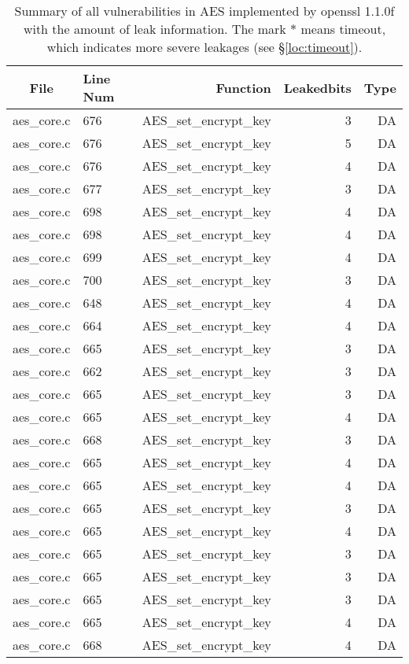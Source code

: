 \begin{table}%
\centering\tiny
\caption{Summary of all vulnerabilities in AES implemented by openssl 1.1.0f with the amount of leak information. The mark $*$ means timeout, which indicates more severe leakages (see \S\ref{loc:timeout}).}\label{tab:AESopenssl}
\begin{tabular}{clrrr}
\hline
\textbf{File} & \textbf{Line Num} & \textbf{Function} & \textbf{Leakedbits} & \textbf{Type} \\\hline
aes\_core.c& 676&AES\_set\_encrypt\_key&3 &DA\\
aes\_core.c& 676&AES\_set\_encrypt\_key&5 &DA\\
aes\_core.c& 676&AES\_set\_encrypt\_key&4 &DA\\
aes\_core.c& 677&AES\_set\_encrypt\_key&3 &DA\\
aes\_core.c& 698&AES\_set\_encrypt\_key&4 &DA\\
aes\_core.c& 698&AES\_set\_encrypt\_key&4 &DA\\
aes\_core.c& 699&AES\_set\_encrypt\_key&4 &DA\\
aes\_core.c& 700&AES\_set\_encrypt\_key&3 &DA\\
aes\_core.c& 648&AES\_set\_encrypt\_key&4 &DA\\
aes\_core.c& 664&AES\_set\_encrypt\_key&4 &DA\\
aes\_core.c& 665&AES\_set\_encrypt\_key&3 &DA\\
aes\_core.c& 662&AES\_set\_encrypt\_key&3 &DA\\
aes\_core.c& 665&AES\_set\_encrypt\_key&3 &DA\\
aes\_core.c& 665&AES\_set\_encrypt\_key&4 &DA\\
aes\_core.c& 668&AES\_set\_encrypt\_key&3 &DA\\
aes\_core.c& 665&AES\_set\_encrypt\_key&4 &DA\\
aes\_core.c& 665&AES\_set\_encrypt\_key&4 &DA\\
aes\_core.c& 665&AES\_set\_encrypt\_key&3 &DA\\
aes\_core.c& 665&AES\_set\_encrypt\_key&4 &DA\\
aes\_core.c& 665&AES\_set\_encrypt\_key&3 &DA\\
aes\_core.c& 665&AES\_set\_encrypt\_key&3 &DA\\
aes\_core.c& 665&AES\_set\_encrypt\_key&3 &DA\\
aes\_core.c& 665&AES\_set\_encrypt\_key&4 &DA\\
aes\_core.c& 668&AES\_set\_encrypt\_key&4 &DA\\

\end{tabular}
\end{table}
